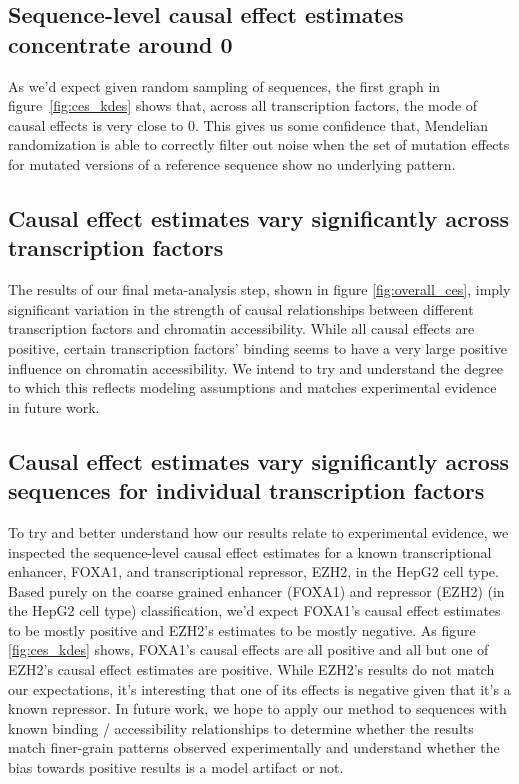 \documentclass{article}
\begin{document}
\subsection*{Sequence-level causal effect estimates concentrate around 0}
As we'd expect given random sampling of sequences, the first graph in figure~\ref{fig:ces_kdes} shows that, across all transcription factors, the mode of causal effects is very close to 0. This gives us some confidence that, Mendelian randomization is able to correctly filter out noise when the set of mutation effects for mutated versions of a reference sequence show no underlying pattern. 

\subsection*{Causal effect estimates vary significantly across transcription factors}
The results of our final meta-analysis step, shown in figure \ref{fig:overall_ces}, imply significant variation in the strength of causal relationships between different transcription factors and chromatin accessibility. While all causal effects are positive, certain transcription factors' binding seems to have a very large positive influence on chromatin accessibility. We intend to try and understand the degree to which this reflects modeling assumptions and matches experimental evidence in future work.

\subsection*{Causal effect estimates vary significantly across sequences for individual transcription factors}
To try and better understand how our results relate to experimental evidence, we inspected the sequence-level causal effect estimates for a known transcriptional enhancer, FOXA1, and transcriptional repressor, EZH2, in the HepG2 cell type. Based purely on the coarse grained enhancer (FOXA1) and repressor (EZH2) (in the HepG2 cell type) classification, we'd expect FOXA1's causal effect estimates to be mostly positive and EZH2's estimates to be mostly negative. As figure \ref{fig:ces_kdes} shows, FOXA1's causal effects are all positive and all but one of EZH2's causal effect estimates are positive. While EZH2's results do not match our expectations, it's interesting that one of its effects is negative given that it's a known repressor. In future work, we hope to apply our method to sequences with known binding / accessibility relationships to determine whether the results match finer-grain patterns observed experimentally and understand whether the bias towards positive results is a model artifact or not.
\end{document}
